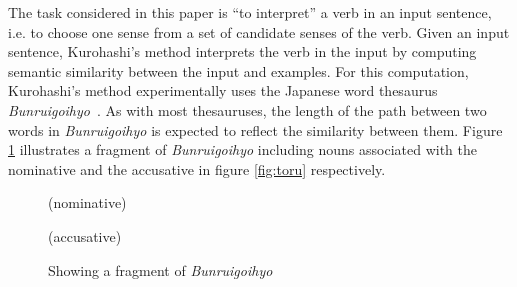 The task considered in this paper is ``to interpret'' a verb in an
input sentence, i.e. to choose one sense from a set of candidate
senses of the verb.  Given an input sentence, Kurohashi's method
interprets the verb in the input by computing semantic similarity
between the input and examples.  For this computation, Kurohashi's
method experimentally uses the Japanese word thesaurus {\it
  Bunruigoihyo\/}~\cite{bgh:64}.  As with most thesauruses, the length
of the path between two words in {\it Bunruigoihyo} is expected to
reflect the similarity between them.  Figure \ref{fig:bgh} illustrates
a fragment of {\it Bunruigoihyo\/} including nouns associated with the
nominative and the accusative in figure \ref{fig:toru} respectively.

\begin{figure}[htbp]
  \small
  \leavevmode
  \begin{minipage}[t]{.47\textwidth}
    \centering
    \parbox{\textwidth}{ 
      {
         \branch{}
        {
           {\branch{}
            { {
                {}}}}}
        } } (nominative)
  \end{minipage}
  \hfill
  \begin{minipage}[t]{.47\textwidth}
    \centering
    \parbox{\textwidth}{ 
      {
        }}
    (accusative)
  \end{minipage}
  \caption{Showing a fragment of {\it Bunruigoihyo\/}}
  \label{fig:bgh}
\end{figure}


